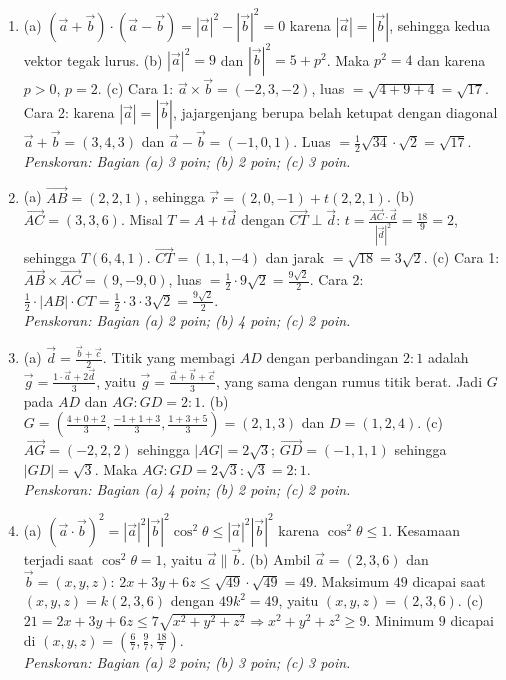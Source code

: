 \documentclass[a4paper,11pt]{article}
\newcommand{\dis}{\displaystyle}
\newcommand{\ov}[1]{\overrightarrow{#1}}
\begin{document}
\small\begin{enumerate}[leftmargin=2em,itemsep=3pt,topsep=2pt]
\item[\textbf{1.}] (a) $(\vec a+\vec b)\cdot(\vec a-\vec b)=|\vec a|^{2}-|\vec b|^{2}=0$ karena $|\vec a|=|\vec b|$, sehingga kedua vektor tegak lurus. (b) $|\vec a|^{2}=9$ dan $|\vec b|^{2}=5+p^{2}$. Maka $p^{2}=4$ dan karena $p>0$, $p=2$. (c) Cara 1: $\vec a\times\vec b=(-2,3,-2)$, luas $=\sqrt{4+9+4}=\sqrt{17}$. Cara 2: karena $|\vec a|=|\vec b|$, jajargenjang berupa belah ketupat dengan diagonal $\vec a+\vec b=(3,4,3)$ dan $\vec a-\vec b=(-1,0,1)$. Luas $=\dis\frac12\sqrt{34}\cdot\sqrt2=\sqrt{17}$. \\ \textit{Penskoran: Bagian (a) 3 poin; (b) 2 poin; (c) 3 poin.}
\item[\textbf{2.}] (a) $\ov{AB}=(2,2,1)$, sehingga $\vec r=(2,0,-1)+t(2,2,1)$. (b) $\ov{AC}=(3,3,6)$. Misal $T=A+t\vec d$ dengan $\ov{CT}\perp\vec d$: $t=\dis\frac{\ov{AC}\cdot\vec d}{|\vec d|^{2}}=\dis\frac{18}{9}=2$, sehingga $T(6,4,1)$. $\ov{CT}=(1,1,-4)$ dan jarak $=\sqrt{18}=3\sqrt2$. (c) Cara 1: $\ov{AB}\times\ov{AC}=(9,-9,0)$, luas $=\dis\frac12\cdot9\sqrt2=\dis\frac{9\sqrt2}{2}$. Cara 2: $\dis\frac12\cdot|AB|\cdot CT=\dis\frac12\cdot3\cdot3\sqrt2=\dis\frac{9\sqrt2}{2}$. \\ \textit{Penskoran: Bagian (a) 2 poin; (b) 4 poin; (c) 2 poin.}
\item[\textbf{3.}] (a) $\vec d=\dis\frac{\vec b+\vec c}{2}$. Titik yang membagi $AD$ dengan perbandingan $2:1$ adalah $\vec g=\dis\frac{1\cdot\vec a+2\vec d}{3}$, yaitu $\vec g=\dis\frac{\vec a+\vec b+\vec c}{3}$, yang sama dengan rumus titik berat. Jadi $G$ pada $AD$ dan $AG:GD=2:1$. (b) $G=\left(\dis\frac{4+0+2}{3},\dis\frac{-1+1+3}{3},\dis\frac{1+3+5}{3}\right)=(2,1,3)$ dan $D=(1,2,4)$. (c) $\ov{AG}=(-2,2,2)$ sehingga $|AG|=2\sqrt3$; $\ov{GD}=(-1,1,1)$ sehingga $|GD|=\sqrt3$. Maka $AG:GD=2\sqrt3:\sqrt3=2:1$. \\ \textit{Penskoran: Bagian (a) 4 poin; (b) 2 poin; (c) 2 poin.}
\item[\textbf{4.}] (a) $(\vec a\cdot\vec b)^{2}=|\vec a|^{2}|\vec b|^{2}\cos^{2}\theta\le|\vec a|^{2}|\vec b|^{2}$ karena $\cos^{2}\theta\le1$. Kesamaan terjadi saat $\cos^{2}\theta=1$, yaitu $\vec a\parallel\vec b$. (b) Ambil $\vec a=(2,3,6)$ dan $\vec b=(x,y,z)$: $2x+3y+6z\le\sqrt{49}\cdot\sqrt{49}=49$. Maksimum $49$ dicapai saat $(x,y,z)=k(2,3,6)$ dengan $49k^{2}=49$, yaitu $(x,y,z)=(2,3,6)$. (c) $21=2x+3y+6z\le7\sqrt{x^{2}+y^{2}+z^{2}}\Rightarrow x^{2}+y^{2}+z^{2}\ge9$. Minimum $9$ dicapai di $(x,y,z)=\left(\dis\frac67,\dis\frac97,\dis\frac{18}{7}\right)$. \\ \textit{Penskoran: Bagian (a) 2 poin; (b) 3 poin; (c) 3 poin.}

\end{enumerate}
\end{document}
